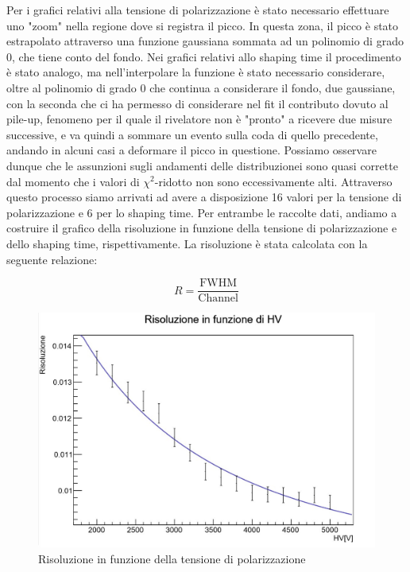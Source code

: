 \documentclass[a4paper,10pt]{article}
\begin{document}
\noindent Per i grafici relativi alla tensione di polarizzazione \`e stato necessario effettuare uno "zoom" nella regione dove si registra il picco. In questa zona, il picco \`e stato estrapolato attraverso una funzione gaussiana sommata ad un polinomio di grado 0, che tiene conto del fondo. Nei grafici relativi allo shaping time il procedimento \`e stato analogo, ma nell'interpolare la funzione \`e stato necessario considerare, oltre al polinomio di grado 0 che continua a considerare il fondo, due gaussiane, con la seconda che ci ha permesso di considerare nel fit il contributo dovuto al pile-up, fenomeno per il quale il rivelatore non \`e "pronto" a ricevere due misure successive, e va quindi a sommare un evento sulla coda di quello precedente, andando in alcuni casi a deformare il picco in questione. Possiamo osservare dunque che le assunzioni sugli andamenti delle distribuzionei sono quasi corrette dal momento che i valori di $\chi^2$-ridotto non sono eccessivamente alti. Attraverso questo processo siamo arrivati ad avere a disposizione 16 valori per la tensione di polarizzazione e 6 per lo shaping time. Per entrambe le raccolte dati, andiamo a costruire il grafico della risoluzione in funzione della tensione di polarizzazione e dello shaping time, rispettivamente. La risoluzione \`e stata calcolata con la seguente relazione: 

\begin{equation}
	R=\frac{\textrm{FWHM}}{\textrm{Channel}}
\end{equation}

\begin{figure}[!ht]
    \centering
    \includegraphics[scale=0.5]{grafici/risoluzionehv}
    \caption{Risoluzione in funzione della tensione di polarizzazione}
\end{figure}
\end{document}
